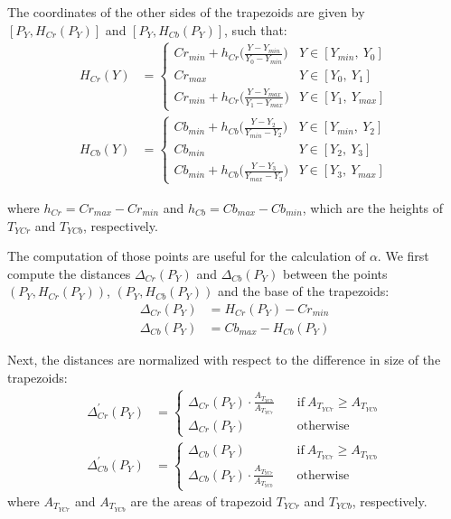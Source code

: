 The coordinates of the other sides of the trapezoids are given by $[P_Y, H_{Cr}(P_Y)]$ and $[P_Y, H_{Cb}(P_Y)]$, such that:
\begin{align}
  H_{Cr}(Y) &=  \begin{cases}
                Cr_{min} + h_{Cr}\big(\frac{Y - Y_{min}}{Y_0 - Y_{min}}\big) & Y \in [Y_{min},\ Y_0] \\
                Cr_{max} & Y \in [Y_0,\ Y_1] \\
                Cr_{min} + h_{Cr}\big(\frac{Y - Y_{max}}{Y_1 - Y_{max}}\big) & Y \in [Y_1,\ Y_{max}]
              \end{cases}
\\
  H_{Cb}(Y) &=  \begin{cases}
                Cb_{min} + h_{Cb}\big(\frac{Y - Y_2}{Y_{min} - Y_2}\big) & Y \in [Y_{min},\ Y_2] \\
                Cb_{min} & Y \in [Y_2,\ Y_3] \\
                Cb_{min} + h_{Cb}\big(\frac{Y - Y_3}{Y_{max} - Y_3}\big) & Y \in [Y_3,\ Y_{max}]
              \end{cases}
\end{align}

\noindent where $h_{Cr} = Cr_{max} - Cr_{min}$ and $h_{Cb} = Cb_{max} - Cb_{min}$, which are the heights of $T_{YCr}$ and $T_{YCb}$, respectively.

The computation of those points are useful for the calculation of $\alpha$. We first compute the distances $\Delta_{Cr}(P_Y)$ and $\Delta_{Cb}(P_Y)$ between the points $(P_Y, H_{Cr}(P_Y))$, $(P_Y, H_{Cb}(P_Y))$ and the base of the trapezoids:
\begin{align}
    \Delta_{Cr}(P_Y) &= H_{Cr}(P_Y) - Cr_{min} \\
    \Delta_{Cb}(P_Y) &= Cb_{max} - H_{Cb}(P_Y)
\end{align}

Next, the distances are normalized with respect to the difference in size of the trapezoids:
\begin{align}
  \Delta^{'}_{Cr}(P_Y) &=  \begin{cases}
                \Delta_{Cr}(P_Y) \cdot \frac{A_{T_{YCb}}} {A_{T_{YCr}}} &\quad \text{if}\ A_{T_{YCr}} \geq A_{T_{YCb}} \\
                \Delta_{Cr}(P_Y) &\quad \text{otherwise}
              \end{cases}
\\
  \Delta^{'}_{Cb}(P_Y) &=  \begin{cases}
                \Delta_{Cb}(P_Y) &\quad \text{if}\ A_{T_{YCr}} \geq A_{T_{YCb}} \\
                \Delta_{Cb}(P_Y) \cdot \frac{A_{T_{YCr}}} {A_{T_{YCb}}} &\quad \text{otherwise}
              \end{cases}
\end{align}
where $A_{T_{YCr}}$ and $A_{T_{YCb}}$ are the areas of trapezoid ${T_{YCr}}$ and ${T_{YCb}}$, respectively.

